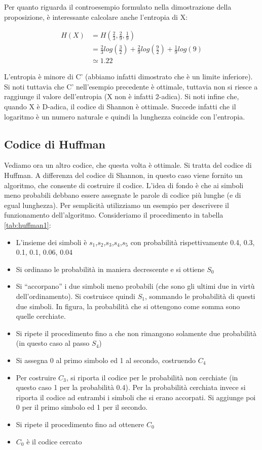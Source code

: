 Per quanto riguarda il controesempio formulato nella dimostrazione della proposizione, è interessante calcolare anche l'entropia di X:

\[\begin{split}
 H(X) &= H \left( \frac{2}{3},\frac{2}{9},\frac{1}{9} \right) \\
      &=\frac{2}{3}log \left (\frac{3}{2} \right) + \frac{2}{9}log \left (\frac{9}{2} \right) 
+ \frac{1}{9}log \left (9 \right) \\
 & \simeq 1.22
  \end{split}
\]

L'entropia è minore di C' (abbiamo infatti dimostrato che è un limite inferiore). Si noti tuttavia che C' nell'esempio precedente 
è ottimale, tuttavia non si riesce a raggiunge il valore dell'entropia (X non è infatti 2-adica). Si noti infine che, quando 
X è D-adica, il codice di Shannon è ottimale. Succede infatti che il logaritmo è un numero naturale e quindi la lunghezza coincide 
con l'entropia.

\subsection{Codice di Huffman}
Vediamo ora un altro codice, che questa volta è ottimale. Si tratta del codice di Huffman.
A differenza del codice di Shannon, in questo caso viene fornito un algoritmo, che consente di costruire il codice.
L'idea di fondo è che ai simboli meno probabili debbano essere assegnate le parole di codice più lunghe (e di egual lunghezza).
Per semplicità utilizziamo un esempio per descrivere il funzionamento dell'algoritmo.
Consideriamo il procedimento in tabella \ref{tab:huffman1}:
\begin{itemize}
 \item L'insieme dei simboli è $s_1$,$s_2$,$s_3$,$s_4$,$s_5$ con probabilità rispettivamente 
       0.4, 0.3, 0.1, 0.1, 0.06, 0.04
 \item Si ordinano le probabilità in maniera decrescente e si ottiene $S_0$
 \item Si ``accorpano'' i due simboli meno probabili (che sono gli ultimi due in virtù dell'ordinamento).
       Si costruisce quindi $S_1$, sommando le probabilità di questi due simboli. In figura, la probabilità 
       che si ottengono come somma sono quelle cerchiate.
 \item Si ripete il procedimento fino a che non rimangono solamente due probabilità (in questo caso al passo $S_4$)
 \item Si assegna 0 al primo simbolo ed 1 al secondo, costruendo $C_4$
 \item Per costruire $C_3$, si riporta il codice per le probabilità non cerchiate (in questo caso 1 per la probabilità 0.4).
       Per la probabilità cerchiata invece si riporta il codice ad entrambi i simboli che si erano accorpati.
       Si aggiunge poi 0 per il primo simbolo ed 1 per il secondo.
 \item Si ripete il procedimento fino ad ottenere $C_0$
 \item $C_0$ è il codice cercato
\end{itemize}

